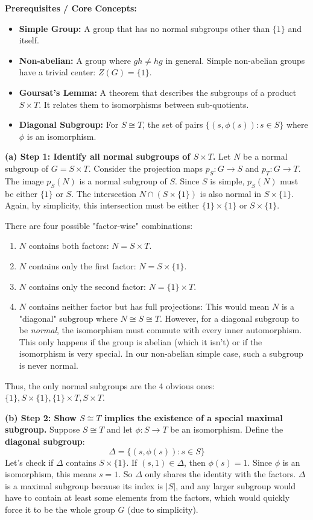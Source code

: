 \begin{solution}
\textbf{Prerequisites / Core Concepts:}
\begin{itemize}
    \item \textbf{Simple Group:} A group that has no normal subgroups other than $\{1\}$ and itself.
    \item \textbf{Non-abelian:} A group where $gh \neq hg$ in general. Simple non-abelian groups have a trivial center: $Z(G) = \{1\}$.
    \item \textbf{Goursat's Lemma:} A theorem that describes the subgroups of a product $S \times T$. It relates them to isomorphisms between sub-quotients.
    \item \textbf{Diagonal Subgroup:} For $S \cong T$, the set of pairs $\{(s, \phi(s)) : s \in S\}$ where $\phi$ is an isomorphism.
\end{itemize}

\textbf{(a) Step 1: Identify all normal subgroups of $S \times T$.}
Let $N$ be a normal subgroup of $G = S \times T$. Consider the projection maps $p_S: G \to S$ and $p_T: G \to T$.
The image $p_S(N)$ is a normal subgroup of $S$. Since $S$ is simple, $p_S(N)$ must be either $\{1\}$ or $S$.
The intersection $N \cap (S \times \{1\})$ is also normal in $S \times \{1\}$. Again, by simplicity, this intersection must be either $\{1\} \times \{1\}$ or $S \times \{1\}$.

There are four possible "factor-wise" combinations:
\begin{enumerate}
    \item $N$ contains both factors: $N = S \times T$.
    \item $N$ contains only the first factor: $N = S \times \{1\}$.
    \item $N$ contains only the second factor: $N = \{1\} \times T$.
    \item $N$ contains neither factor but has full projections: This would mean $N$ is a "diagonal" subgroup where $N \cong S \cong T$. However, for a diagonal subgroup to be \textit{normal}, the isomorphism must commute with every inner automorphism. This only happens if the group is abelian (which it isn't) or if the isomorphism is very special. In our non-abelian simple case, such a subgroup is never normal.
\end{enumerate}
Thus, the only normal subgroups are the 4 obvious ones: $\{1\}, S \times \{1\}, \{1\} \times T, S \times T$.

\textbf{(b) Step 2: Show $S \cong T$ implies the existence of a special maximal subgroup.}
Suppose $S \cong T$ and let $\phi: S \to T$ be an isomorphism.
Define the \textbf{diagonal subgroup}:
\[ \Delta = \{ (s, \phi(s)) : s \in S \} \]
Let's check if $\Delta$ contains $S \times \{1\}$. If $(s, 1) \in \Delta$, then $\phi(s) = 1$. Since $\phi$ is an isomorphism, this means $s=1$. So $\Delta$ only shares the identity with the factors.
$\Delta$ is a maximal subgroup because its index is $|S|$, and any larger subgroup would have to contain at least some elements from the factors, which would quickly force it to be the whole group $G$ (due to simplicity).


\end{solution}
